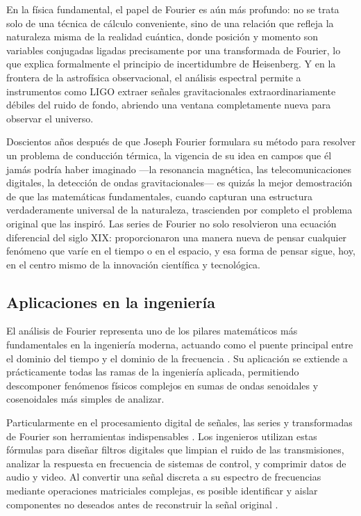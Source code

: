 En la física fundamental, el papel de Fourier es aún más profundo: no se trata solo de una técnica de cálculo conveniente, sino de una relación que refleja la naturaleza misma de la realidad cuántica, donde posición y momento son variables conjugadas ligadas precisamente por una transformada de Fourier, lo que explica formalmente el principio de incertidumbre de Heisenberg. Y en la frontera de la astrofísica observacional, el análisis espectral permite a instrumentos como LIGO extraer señales gravitacionales extraordinariamente débiles del ruido de fondo, abriendo una ventana completamente nueva para observar el universo.

Doscientos años después de que Joseph Fourier formulara su método para resolver un problema de conducción térmica, la vigencia de su idea en campos que él jamás podría haber imaginado —la resonancia magnética, las telecomunicaciones digitales, la detección de ondas gravitacionales— es quizás la mejor demostración de que las matemáticas fundamentales, cuando capturan una estructura verdaderamente universal de la naturaleza, trascienden por completo el problema original que las inspiró. Las series de Fourier no solo resolvieron una ecuación diferencial del siglo XIX: proporcionaron una manera nueva de pensar cualquier fenómeno que varíe en el tiempo o en el espacio, y esa forma de pensar sigue, hoy, en el centro mismo de la innovación científica y tecnológica.

\subsection{Aplicaciones en la ingeniería}
\label{sec:cap01:marco-teorico:ingenieria}

El análisis de Fourier representa uno de los pilares matemáticos más fundamentales en la ingeniería moderna, actuando como el puente principal entre el dominio del tiempo y el dominio de la frecuencia \cite{oppenheim:dsp:2009}. Su aplicación se extiende a prácticamente todas las ramas de la ingeniería aplicada, permitiendo descomponer fenómenos físicos complejos en sumas de ondas senoidales y cosenoidales más simples de analizar.

Particularmente en el procesamiento digital de señales, las series y transformadas de Fourier son herramientas indispensables \cite{mitra:dsp:2011}. Los ingenieros utilizan estas fórmulas para diseñar filtros digitales que limpian el ruido de las transmisiones, analizar la respuesta en frecuencia de sistemas de control, y comprimir datos de audio y video. Al convertir una señal discreta a su espectro de frecuencias mediante operaciones matriciales complejas, es posible identificar y aislar componentes no deseados antes de reconstruir la señal original \cite{mitra:dsp:2011}.

